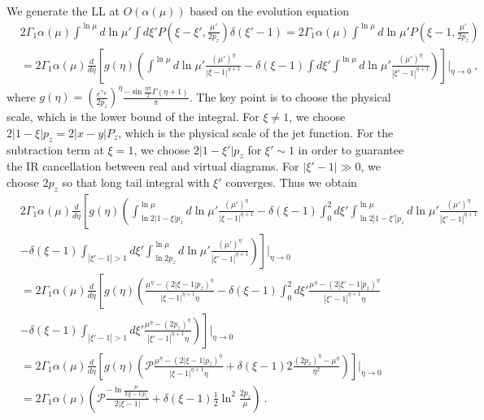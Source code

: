 \documentclass[a4paper,11pt]{article}
\begin{document}
We generate the LL at $O(\alpha(\mu))$ based on the evolution equation
\begin{align}
& 2 \Gamma_{1} \alpha(\mu) \int^{\ln \mu} d\ln \mu' \int d\xi' P\left(\xi-\xi',\frac{\mu'}{2 p_z}\right) \delta(\xi'-1) = 2 \Gamma_{1} \alpha(\mu) \int^{\ln \mu} d\ln \mu' P\left(\xi-1,\frac{\mu'}{2 p_z}\right) \nonumber\\
&= 2 \Gamma_{1} \alpha(\mu) \frac{d}{d \eta} \left[g(\eta) \left(\int^{\ln \mu} d\ln \mu' \frac{(\mu')^{\eta}}{|\xi-1|^{\eta+1}} - \delta(\xi-1) \int d\xi' \int^{\ln \mu} d\ln \mu' \frac{(\mu')^{\eta}}{|\xi'-1|^{\eta+1}} \right)  \right] \Bigg|_{\eta \rightarrow 0} \ ,
\end{align}
where $g(\eta) = \left(\frac{e^{\gamma_E}}{2p_z}\right)^{\eta} \frac{- \sin \frac{\eta \pi}{2} \Gamma(\eta+1)}{\pi}$. The key point is to choose the physical scale, which is the lower bound of the integral. For $\xi \neq 1 $, we choose $ 2|1-\xi|p_z = 2|x-y|P_z$, which is the physical scale of the jet function. For the subtraction term at $\xi = 1$, we choose $ 2|1-\xi'|p_z$ for $\xi' \sim 1$ in order to guarantee the IR cancellation between real and virtual diagrams. For $|\xi'-1| \gg 0$, we choose $2p_z$ so that long tail integral with $\xi'$ converges. Thus we obtain
\begin{align}
& 2 \Gamma_{1} \alpha(\mu) \frac{d}{d \eta} \left[g(\eta) \left(\int^{\ln \mu}_{\ln 2|1-\xi|p_z} d\ln \mu' \frac{(\mu')^{\eta}}{|\xi-1|^{\eta+1}} - \delta(\xi-1) \int_{0}^{2} d\xi' \int^{\ln \mu}_{\ln 2|1-\xi'|p_z} d\ln \mu' \frac{(\mu')^{\eta}}{|\xi'-1|^{\eta+1}} \right.\right. \nonumber\\
& \left.\left. - \delta(\xi-1) \int_{|\xi'-1|>1} d\xi' \int^{\ln \mu}_{\ln 2 p_z} d\ln \mu' \frac{(\mu')^{\eta}}{|\xi'-1|^{\eta+1}} \right) \right] \Bigg|_{\eta \rightarrow 0}\nonumber\\
&= 2 \Gamma_{1} \alpha(\mu) \frac{d}{d \eta} \left[g(\eta) \left( \frac{\mu^{\eta} - (2|\xi-1|p_z)^\eta}{|\xi-1|^{\eta+1} \eta} - \delta(\xi-1) \int_{0}^{2} d\xi' \frac{\mu^{\eta} - (2|\xi'-1|p_z)^\eta}{|\xi'-1|^{\eta+1}\eta} \right.\right. \nonumber\\
& \left.\left. - \delta(\xi-1) \int_{|\xi'-1|>1} d\xi' \frac{ \mu^{\eta} - (2p_z)^\eta }{|\xi'-1|^{\eta+1}\eta} \right) \right] \Bigg|_{\eta \rightarrow 0} \nonumber\\
&= 2 \Gamma_{1} \alpha(\mu) \frac{d}{d \eta} \left[g(\eta) \left( \mathcal{P} \frac{\mu^{\eta} - (2|\xi-1|p_z)^\eta}{|\xi-1|^{\eta+1} \eta}  + \delta(\xi-1) 2 \frac{(2p_z)^\eta -\mu^\eta }{\eta^2} \right) \right] \Bigg|_{\eta \rightarrow 0} \nonumber\\
&= 2 \Gamma_{1} \alpha(\mu) \left( \mathcal{P} \frac{-\ln \frac{\mu}{2|\xi-1|p_z}}{2|\xi-1|} + \delta(\xi-1) \frac{1}{2} \ln^2 \frac{2p_z}{\mu}\right) \ .
\end{align}
\end{document}
